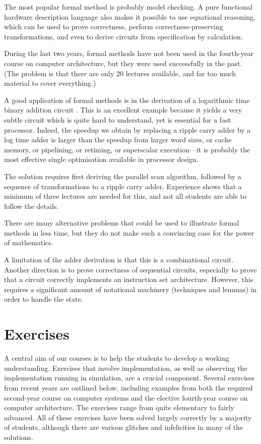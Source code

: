 \documentclass[submission,copyright,creativecommons]{eptcs}
\begin{document}
The most popular formal method is probably model checking.  A pure
functional hardware description language also makes it possible to
use equational reasoning, which can be used to prove correctness,
perform correctness-preserving transformations, and even to derive
circuits from specification by calculation.

During the last two years, formal methods have not been used in the
fourth-year course on computer architecture, but they were used
successfully in the past.  (The problem is that there are only 20
lectures available, and far too much material to cover everything.)

A good application of formal methods is in the derivation of a
logarithmic time binary addition circuit \cite{2004-ODR-Adder-JFP}.
This is an excellent example because it yields a very subtle
circuit which is quite hard to understand, yet is essential for a
fast processor.  Indeed, the speedup we obtain by replacing a
ripple carry adder by a log time adder is larger than the speedup
from larger word sizes, or cache memory, or pipelining, or
retiming, or superscalar execution---it is probably the most
effective single optimisation available in processor design.

The solution requires first deriving the parallel scan algorithm,
followed by a sequence of transformations to a ripple carry adder.
Experience shows that a minimum of three lectures are needed for
this, and not all students are able to follow the details.

There are many alternative problems that could be used to
illustrate formal methods in less time, but they do not make such a
convincing case for the power of mathematics.

A limitation of the adder derivation is that this is a
combinational circuit.  Another direction is to prove correctness
of sequential circuits, especially to prove that a circuit
correctly implements an instruction set architecture.  However,
this requires a significant amount of notational machinery
(techniques and lemmas) in order to handle the state.

\section{Exercises}
\label{sec:exercises}

A central aim of our courses is to help the students to develop a
working understanding.  Exercises that involve implementation, as
well as observing the implementation running in simulation, are a
crucial component.  Several exercises from recent years are
outlined below, including examples from both the required
second-year course on computer systems and the elective fourth-year
course on computer architecture.  The exercises range from quite
elementary to fairly advanced.  All of these exercises have been
solved largely correctly by a majority of students, although there
are various glitches and infelicities in many of the solutions.
\end{document}
